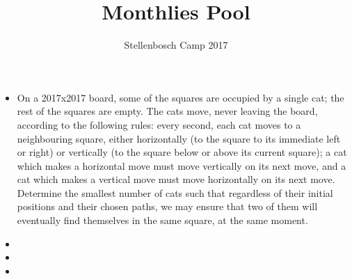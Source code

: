 \documentclass[12pt]{article}
\title{Monthlies Pool}
\author{Stellenbosch Camp 2017}
\begin{document}
 \maketitle

\begin{itemize}

\item %

On a 2017x2017 board, some of the squares are occupied by a single cat; the rest of the squares are empty. The cats move, never leaving the board, according to the following rules: every second, each cat moves to a neighbouring square, either horizontally (to the square to its immediate left or right) or vertically (to the square below or above its current square); a cat which makes a horizontal move must move vertically on its next move, and a cat which makes a vertical move must move horizontally on its next move. Determine the smallest number of cats such that regardless of their initial positions and their chosen paths, we may ensure that two of them will eventually find themselves in the same square, at the same moment.

\item %
 

\item %


\item %


\end{itemize}

\vfill

\centering
\begin{BVerbatim}
\end{BVerbatim}
\end{document}
